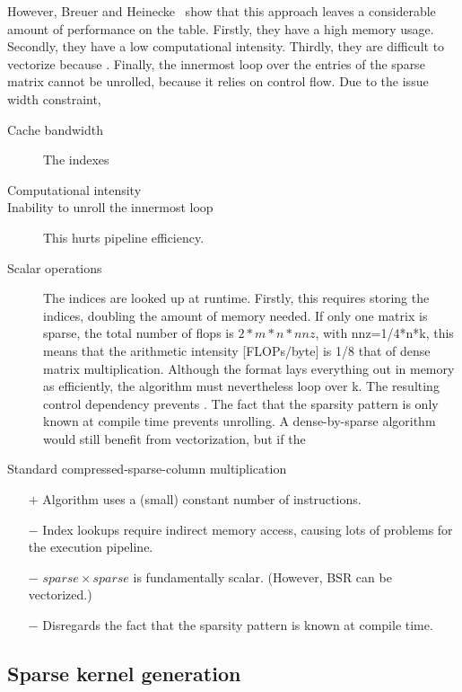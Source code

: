       However, Breuer and Heinecke~\cite{breuer} show that this approach leaves a considerable amount of performance on the table. Firstly, they have a high memory usage. Secondly, they have a low computational intensity. Thirdly, they are difficult to vectorize because . Finally, the innermost loop over the entries of the sparse matrix cannot be unrolled, because it relies on control flow. Due to the issue width constraint, 

      \begin{description}
        \item[Cache bandwidth] The indexes 
        \item[Computational intensity]
        \item[Inability to unroll the innermost loop] This hurts pipeline efficiency.
        \item[Scalar operations]

        The indices are looked up at runtime. Firstly, this requires storing the indices, doubling the amount of memory needed. If only one matrix is sparse, the total number of flops is $2 * m * n * nnz$, with nnz=1/4*n*k, this means that the arithmetic intensity [FLOPs/byte] is 1/8 that of dense matrix multiplication. 
        Although the format lays everything out in memory as efficiently, the algorithm must nevertheless loop over k. The resulting control dependency prevents . The fact that the sparsity pattern is only known at compile time prevents unrolling. 
        A dense-by-sparse algorithm would still benefit from vectorization, but if the 

      \end{description}


      Standard compressed-sparse-column multiplication
        \begin{itemize}
          \item[$+$] Algorithm uses a (small) constant number of instructions.
          \item[$-$] Index lookups require indirect memory access, causing lots of problems for the execution pipeline.
          \item[$-$] $sparse \times sparse$ is fundamentally scalar. (However, BSR can be vectorized.)
          \item[$-$] Disregards the fact that the sparsity pattern is known at compile time.
        \end{itemize}




\subsection{Sparse kernel generation}
    
